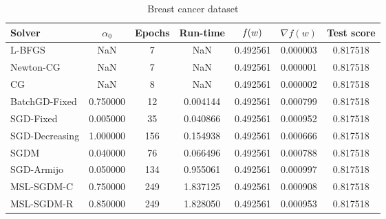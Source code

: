 \begin{table}
\centering
\caption{Breast cancer dataset}
\label{tab:breast-tab}
\begin{tabular}{lS[round-precision=3]S[drop-zero-decimal]S[round-precision=4]S[round-precision=6]S[exponent-mode=scientific]S[round-precision=6]}
\toprule
Solver & {$\alpha_0$} & {Epochs} & {Run-time} & {$\operatorname*{\mathit{f}}(w)$} & {$\nabla f(w)$} & {Test score} \\
\midrule
L-BFGS & NaN & 7 & NaN & 0.492561 & 0.000003 & 0.817518 \\
Newton-CG & NaN & 7 & NaN & 0.492561 & 0.000001 & 0.817518 \\
CG & NaN & 8 & NaN & 0.492561 & 0.000002 & 0.817518 \\
BatchGD-Fixed & 0.750000 & 12 & 0.004144 & 0.492561 & 0.000799 & 0.817518 \\
SGD-Fixed & 0.005000 & 35 & 0.040866 & 0.492561 & 0.000952 & 0.817518 \\
SGD-Decreasing & 1.000000 & 156 & 0.154938 & 0.492561 & 0.000666 & 0.817518 \\
SGDM & 0.040000 & 76 & 0.066496 & 0.492561 & 0.000788 & 0.817518 \\
SGD-Armijo & 0.050000 & 134 & 0.955061 & 0.492561 & 0.000997 & 0.817518 \\
MSL-SGDM-C & 0.750000 & 249 & 1.837125 & 0.492561 & 0.000908 & 0.817518 \\
MSL-SGDM-R & 0.850000 & 249 & 1.828050 & 0.492561 & 0.000953 & 0.817518 \\
\bottomrule
\end{tabular}
\end{table}

